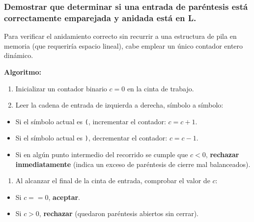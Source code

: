 \documentclass[12pt]{book} %
\providecommand{\tightlist}{%
  \setlength{\itemsep}{0pt}\setlength{\parskip}{0pt}}
\begin{document}
\hypertarget{demostrar-que-determinar-si-una-entrada-de-paruxe9ntesis-estuxe1-correctamente-emparejada-y-anidada-estuxe1-en-l.}{%
\subsubsection{Demostrar que determinar si una entrada de paréntesis
está correctamente emparejada y anidada está en
L.}\label{demostrar-que-determinar-si-una-entrada-de-paruxe9ntesis-estuxe1-correctamente-emparejada-y-anidada-estuxe1-en-l.}}

Para verificar el anidamiento correcto sin recurrir a una estructura de
pila en memoria (que requeriría espacio lineal), cabe emplear un único
contador entero dinámico.

\textbf{Algoritmo:}

\begin{enumerate}
\def\labelenumi{\arabic{enumi}.}
\tightlist
\item
  Inicializar un contador binario \(c = 0\) en la cinta de trabajo.
\item
  Leer la cadena de entrada de izquierda a derecha, símbolo a símbolo:
\end{enumerate}

\begin{itemize}
\tightlist
\item
  Si el símbolo actual es \texttt{(}, incrementar el contador:
  \(c = c + 1\).
\item
  Si el símbolo actual es \texttt{)}, decrementar el contador:
  \(c = c - 1\).
\item
  Si en algún punto intermedio del recorrido se cumple que \(c < 0\),
  \textbf{rechazar inmediatamente} (indica un exceso de paréntesis de
  cierre mal balanceados).
\end{itemize}

\begin{enumerate}
\def\labelenumi{\arabic{enumi}.}
\setcounter{enumi}{2}
\tightlist
\item
  Al alcanzar el final de la cinta de entrada, comprobar el valor de
  \(c\):
\end{enumerate}

\begin{itemize}
\tightlist
\item
  Si \(c == 0\), \textbf{aceptar}.
\item
  Si \(c > 0\), \textbf{rechazar} (quedaron paréntesis abiertos sin
  cerrar).
\end{itemize}
\end{document}
